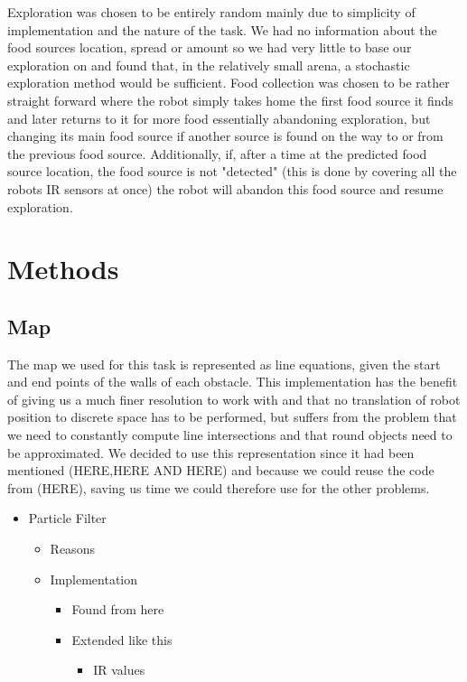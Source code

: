 \documentclass[paper=a4, fontsize=12pt]{scrartcl}	%
\numberwithin{equation}{section}		%
\numberwithin{figure}{section}			%
\numberwithin{table}{section}				%
\begin{document}
Exploration was chosen to be entirely random mainly due to simplicity of implementation and the nature of the task. We had no information about the food sources location, spread or amount so we had very little to base our exploration on and found that, in the relatively small arena, a stochastic exploration method would be sufficient. Food collection was chosen to be rather straight forward where the robot simply takes home the first food source it finds and later returns to it for more food essentially abandoning exploration, but changing its main food source if another source is found on the way to or from the previous food source. Additionally, if, after a time at the predicted food source location, the food source is not "detected" (this is done by covering all the robots IR sensors at once) the robot will abandon this food source and resume exploration.

\section{Methods} 
\subsection{Map}
The map we used for this task is represented as line equations, given the start and end points of the walls of each obstacle. This implementation has the benefit of giving us a much finer resolution to work with and that no translation of robot position to discrete space has to be performed, but suffers from the problem that we need to constantly compute line intersections and that round objects need to be approximated. We decided to use this representation since it had been mentioned (HERE,HERE AND HERE) and because we could reuse the code from (HERE), saving us time we could therefore use for the other problems.

\begin{itemize}
\item Particle Filter
\begin{itemize}
\item Reasons
\item Implementation
\begin{itemize}
\item Found from here
\item Extended like this
\begin{itemize}
\item IR values
\end{itemize}
\end{itemize}
\end{itemize}
\end{itemize}
\end{document}
